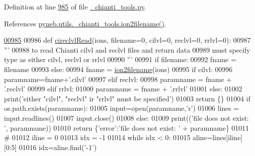 Definition at line \hyperlink{__chianti__tools_8py_source_l00985}{985} of file \hyperlink{__chianti__tools_8py_source}{\-\_\-chianti\-\_\-tools.\-py}.



References \hyperlink{__chianti__tools_8py_source_l00396}{pyneb.\-utils.\-\_\-chianti\-\_\-tools.\-ion2filename()}.


\begin{DoxyCode}
\hypertarget{namespacepyneb_1_1utils_1_1__chianti__tools_l00985}{}\hyperlink{namespacepyneb_1_1utils_1_1__chianti__tools_a0811a3ad9efb623a53fd1ebfd8c5c73f}{00985} 
00986 \textcolor{keyword}{def }\hyperlink{namespacepyneb_1_1utils_1_1__chianti__tools_a0811a3ad9efb623a53fd1ebfd8c5c73f}{cireclvlRead}(ions, filename=0, cilvl=0, reclvl=0, rrlvl=0):
00987     \textcolor{stringliteral}{'''}
00988 \textcolor{stringliteral}{    to read Chianti cilvl and reclvl files and return data}
00989 \textcolor{stringliteral}{    must specify type as either cilvl, reclvl or rrlvl}
00990 \textcolor{stringliteral}{    '''}
00991     \textcolor{keywordflow}{if} filename:
00992         fname = filename
00993     \textcolor{keywordflow}{else}:
00994         fname = \hyperlink{namespacepyneb_1_1utils_1_1__chianti__tools_a7748521ca99103785680d691667ce851}{ion2filename}(ions)
00995     \textcolor{keywordflow}{if} cilvl:
00996         paramname=fname+\textcolor{stringliteral}{'.cilvl'}
00997     \textcolor{keywordflow}{elif} reclvl:
00998         paramname = fname + \textcolor{stringliteral}{'.reclvl'}
00999     \textcolor{keywordflow}{elif} rrlvl:
01000         paramname = fname + \textcolor{stringliteral}{'.rrlvl'}
01001     \textcolor{keywordflow}{else}:
01002         print(\textcolor{stringliteral}{'either "cilvl", "reclvl" ir "rrlvl" must be specified'})
01003         \textcolor{keywordflow}{return} \{\}
01004     \textcolor{keywordflow}{if} os.path.exists(paramname):
01005         input=open(paramname,\textcolor{stringliteral}{'}\textcolor{stringliteral}{r')}
01006 \textcolor{stringliteral}{        lines = input.readlines()}
01007 \textcolor{stringliteral}{        input.close()}
01008 \textcolor{stringliteral}{    }\textcolor{keywordflow}{else}:
01009         print((\textcolor{stringliteral}{'file does not exist:  '}, paramname))
01010         \textcolor{keywordflow}{return} \{\textcolor{stringliteral}{'error'}:\textcolor{stringliteral}{'file does not exist: '} + paramname\}
01011     \textcolor{comment}{#}
01012     iline = 0
01013     idx = -1
01014     \textcolor{keywordflow}{while} idx < 0:
01015         aline=lines[iline][0:5]
01016         idx=aline.find(\textcolor{stringliteral}{'-1'})

\end{DoxyCode}
